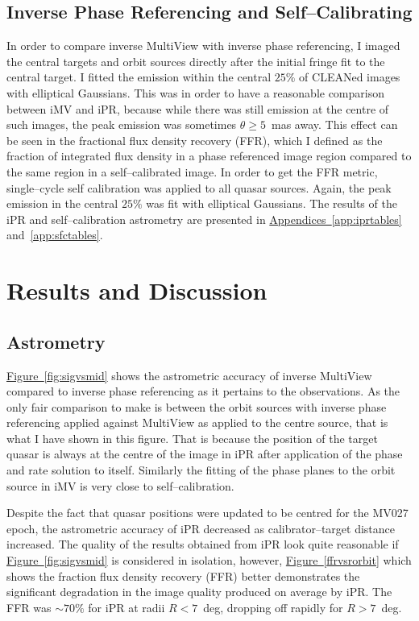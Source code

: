 	\subsection{Inverse Phase Referencing and Self--Calibrating}
		In order to compare inverse MultiView with inverse phase referencing, I imaged the central targets and orbit sources directly after the initial fringe fit to the central target. I fitted the emission within the central $25\%$ of CLEANed images with elliptical Gaussians. This was in order to have a reasonable comparison between iMV and iPR, because while there was still emission at the centre of such images, the peak emission was sometimes $\theta\ge5$~mas away. This effect can be seen in the fractional flux density recovery (FFR), which I defined as the fraction of integrated flux density in a phase referenced image region compared to the same region in a self--calibrated image. In order to get the FFR metric, single--cycle self calibration was applied to all quasar sources. Again, the peak emission in the central $25\%$ was fit with elliptical Gaussians. The results of the iPR and self--calibration astrometry are presented in \hyperref[app:iprtables]{Appendices~\ref*{app:iprtables}} and~\ref{app:sfctables}. 

\clearpage	
\section{Results and Discussion}
	\subsection{Astrometry} \label{sec:mvastrometry}
		\hyperref[fig:sigvsmid]{Figure~\ref*{fig:sigvsmid}} shows the astrometric accuracy of inverse MultiView compared to inverse phase referencing as it pertains to the observations. As the only fair comparison to make is between the orbit sources with inverse phase referencing applied against MultiView as applied to the centre source, that is what I have shown in this figure. That is because the position of the target quasar is always at the centre of the image in iPR after application of the phase and rate solution to itself. Similarly the fitting of the phase planes to the orbit source in iMV is very close to self--calibration.
		
		Despite the fact that quasar positions were updated to be centred for the MV027 epoch, the astrometric accuracy of iPR decreased as calibrator--target distance increased. The quality of the results obtained from iPR look quite reasonable if \hyperref[fig:sigvsmid]{Figure~\ref*{fig:sigvsmid}} is considered in isolation, however, \hyperref[ffrvsrorbit]{Figure~\ref*{ffrvsrorbit}} which shows the fraction flux density recovery (FFR) better demonstrates the significant degradation in the image quality produced on average by iPR. The FFR was $\sim70\%$ for iPR at radii $R<7$~deg, dropping off rapidly for $R>7$~deg.	
	
